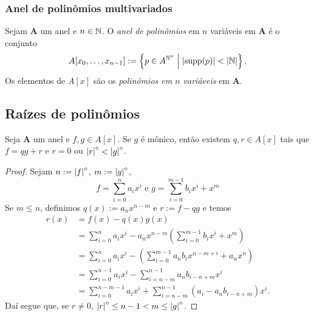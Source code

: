 \subsubsection{Anel de polinômios multivariados}

\begin{definition}
Sejam $\bm A$ um anel e $n \in \mathbb{N}$. O \emph{anel de polinômios} em $n$ variáveis em $\bm A$ é o conjunto
	\begin{equation*}
	A[x_0,\ldots,x_{n-1}] := \left\{{p \in A^{\mathbb{N}^n}}\;\middle\vert\;{\left\lvert{\operatorname{supp}(p)}\right\rvert < \left\lvert{\mathbb{N}}\right\rvert}\right\}.
	\end{equation*}
Os elementos de $A[x]$ são os \emph{polinômios em $n$ variáveis} em $\bm A$.
\end{definition}



\subsection{Raízes de polinômios}

\begin{proposition}
Seja $\bm A$ um anel e $f,g \in A[x]$. Se $g$ é mônico, então existem $q,r \in A[x]$ tais que $f=qg+r$ e $r=0$ ou $\left\vert{r}\right\vert^{\circ} < \left\vert{g}\right\vert^{\circ}$.
\end{proposition}
\begin{proof}
Sejam $n := \left\vert{f}\right\vert^{\circ}$, $m := \left\vert{g}\right\vert^{\circ}$,
	\begin{equation*}
	f = \sum_{i=0}^n a_ix^i \text{\ \ e\ \ } g = \sum_{i=0}^{m-1} b_ix^i + x^m
	\end{equation*}
Se $m \leq n$, definimos $q(x) := a_nx^{n-m}$ e $r := f-qg$ e temos
	\begin{align*}
	r(x) &= f(x) - q(x)g(x) \\
	&= \sum_{i=0}^n a_ix^i - a_nx^{n-m}\left(\sum_{i=0}^{m-1} b_ix^i + x^m\right) \\
	&= \sum_{i=0}^n a_ix^i - \left(\sum_{i=0}^{m-1} a_nb_ix^{n-m+i} + a_nx^n\right) \\
	&= \sum_{i=0}^{n-1} a_ix^i - \sum_{i=n-m}^{n-1} a_nb_{i-n+m}x^i \\
	&= \sum_{i=0}^{n-m-1} a_ix^i + \sum_{i=n-m}^{n-1} (a_i - a_nb_{i-n+m})x^i.
	\end{align*}
Daí segue que, se $r \neq 0$, $\left\vert{r}\right\vert^{\circ} \leq n-1 < m \leq \left\vert{g}\right\vert^{\circ}$.
%
\end{proof}

